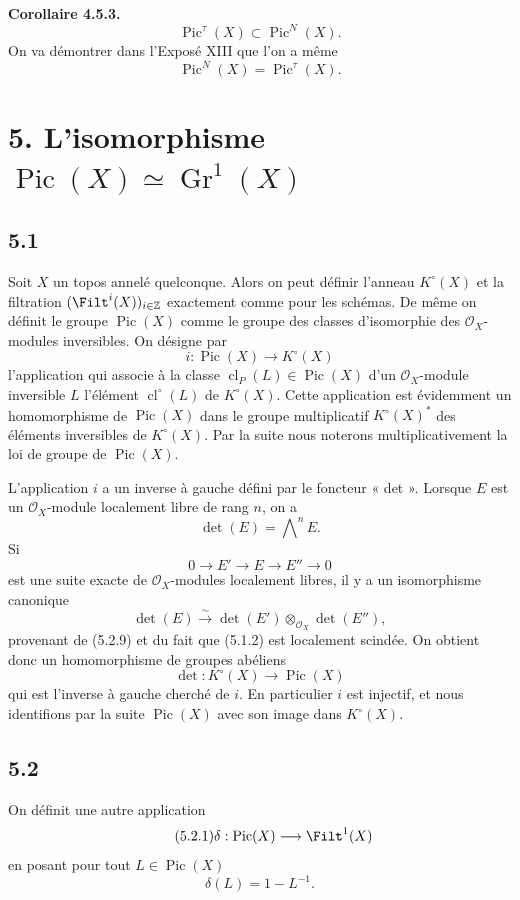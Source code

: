 \documentclass[11pt]{article}
\newcommand{\Gr}{\operatorname{Gr}}
\newcommand{\cl}{\operatorname{cl}}
\providecommand{\Pic}{\operatorname{Pic}}
\providecommand{\Gr}{\operatorname{Gr}}
\providecommand{\Gr}{\operatorname{G}}
\begin{document}
\textbf{Corollaire 4.5.3.}
\[
 \Pic^\tau(X)\subset \Pic^N(X).
\]
On va démontrer dans l'Exposé XIII que l'on a même
\[
 \Pic^N(X)=\Pic^\tau(X).
\]

\section*{5. L'isomorphisme \(\Pic(X)\simeq\Gr^1(X)\)}

\subsection*{5.1}
Soit \(X\) un topos annelé quelconque. Alors on peut définir l'anneau \(K^\circ(X)\) et la filtration \((\Filt^i(X))_{i\in\mathbb Z}\) exactement comme pour les schémas. De même on définit le groupe \(\Pic(X)\) comme le groupe des classes d'isomorphie des \(\mathcal O_X\)-modules inversibles. On désigne par
\begin{equation}\tag{5.1.1}
 i:\Pic(X)\longrightarrow K^\circ(X)
\end{equation}
l'application qui associe à la classe \(\cl_P(L)\in\Pic(X)\) d'un \(\mathcal O_X\)-module inversible \(L\) l'élément \(\cl^\circ(L)\) de \(K^\circ(X)\). Cette application est évidemment un homomorphisme de \(\Pic(X)\) dans le groupe multiplicatif \(K^\circ(X)^*\) des éléments inversibles de \(K^\circ(X)\). Par la suite nous noterons multiplicativement la loi de groupe de \(\Pic(X)\).

L'application \(i\) a un inverse à gauche défini par le foncteur « det ». Lorsque \(E\) est un \(\mathcal O_X\)-module localement libre de rang \(n\), on a
\[
 \det(E)=\bigwedge\nolimits^n E.
\]
Si
\begin{equation}\tag{5.1.2}
0\longrightarrow E'\longrightarrow E\longrightarrow E''\longrightarrow0
\end{equation}
est une suite exacte de \(\mathcal O_X\)-modules localement libres, il y a un isomorphisme canonique
\[
 \det(E)\xrightarrow{\sim}\det(E')\otimes_{\mathcal O_X}\det(E''),
\]
provenant de (5.2.9) et du fait que (5.1.2) est localement scindée. On obtient donc un homomorphisme de groupes abéliens
\begin{equation}\tag{5.1.3}
 \det:K^\circ(X)\longrightarrow\Pic(X)
\end{equation}
qui est l'inverse à gauche cherché de \(i\). En particulier \(i\) est injectif, et nous identifions par la suite \(\Pic(X)\) avec son image dans \(K^\circ(X)\).

\subsection*{5.2}
On définit une autre application
\begin{equation}\tag{5.2.1}
 \delta:\Pic(X)\longrightarrow\Filt^1(X)
\end{equation}
en posant pour tout \(L\in\Pic(X)\)
\[
 \delta(L)=1-L^{-1}.
\]
\end{document}
